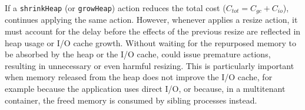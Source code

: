 
If a \texttt{shrinkHeap} (or \texttt{growHeap}) action reduces the total cost ($C_\mathit{tot} = C_\mathit{gc} + C_\mathit{io}$), \flexheapName{} continues applying the same action.
However, whenever \flexheapName{} applies a resize action, it must account for the delay before the effects of the previous resize are reflected in heap usage or I/O cache growth.
Without waiting for the repurposed memory to be absorbed by the heap or the I/O cache, \flexheapName{} could issue premature actions, resulting in unnecessary or even harmful resizing.
This is particularly important when memory released from the heap does not improve the I/O cache, for example because the application uses direct I/O, or because, in a multitenant container, the freed memory is consumed by sibling processes instead.

